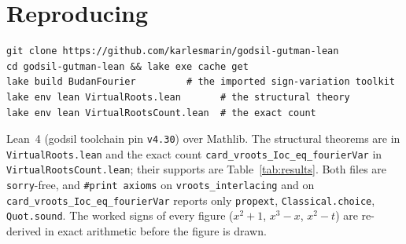 \documentclass[11pt]{article}
\newcommand{\lean}[1]{\texttt{#1}}
\begin{document}
\section*{Reproducing}
\begin{verbatim}
git clone https://github.com/karlesmarin/godsil-gutman-lean
cd godsil-gutman-lean && lake exe cache get
lake build BudanFourier         # the imported sign-variation toolkit
lake env lean VirtualRoots.lean       # the structural theory
lake env lean VirtualRootsCount.lean  # the exact count
\end{verbatim}
{\sloppy Lean~4 (godsil toolchain pin \lean{v4.30}) over Mathlib. The structural theorems are in
\lean{VirtualRoots.lean} and the exact count \lean{card\_vroots\_Ioc\_eq\_fourierVar} in
\lean{VirtualRootsCount.lean}; their supports are Table~\ref{tab:results}. Both files are
\lean{sorry}-free, and \lean{\#print axioms} on \lean{vroots\_interlacing} and on
\lean{card\_vroots\_Ioc\_eq\_fourierVar} reports only \lean{propext}, \lean{Classical.choice},
\lean{Quot.sound}. The worked signs of every figure ($x^2+1$, $x^3-x$, $x^2-t$) are re-derived in exact
arithmetic before the figure is drawn.\par}
\end{document}
